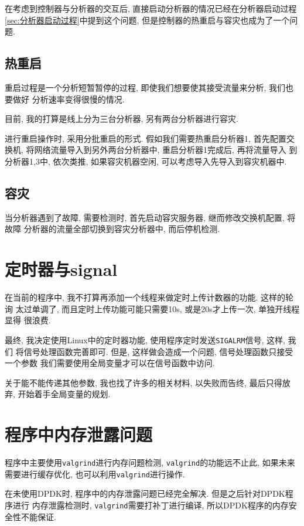 在考虑到控制器与分析器的交互后,
直接启动分析器的情况已经在分析器启动过程\ref{sec:分析器启动过程}中提到这个问题,
但是控制器的热重启与容灾也成为了一个问题.

\subsection{热重启}

重启过程是一个分析短暂暂停的过程, 即使我们想要使其接受流量来分析,
我们也要做好 分析速率变得很慢的情况.

目前, 我的打算是线上分为三台分析器, 另有两台分析器进行容灾.

进行重启操作时, 采用分批重启的形式. 假如我们需要热重启分析器1,
首先配置交换机, 将网络流量导入到另外两台分析器中, 重启分析器1完成后,
再将流量导入 到分析器1,3中, 依次类推, 如果容灾机器空闲,
可以考虑导入先导入到容灾机器中.

\subsection{容灾}

当分析器遇到了故障, 需要检测时, 首先启动容灾服务器, 继而修改交换机配置,
将故障 分析器的流量全部切换到容灾分析器中, 而后停机检测.

\section{定时器与signal}

在当前的程序中, 我不打算再添加一个线程来做定时上传计数器的功能.
这样的轮询 太过单调了, 而且定时上传功能可能只需要10s, 或是20s才上传一次,
单独开线程显得 很浪费.

最终, 我决定使用Linux中的定时器功能,
使用程序定时发送\texttt{SIGALRM}信号, 这样, 我们 将信号处理函数完善即可.
但是, 这样做会造成一个问题, 信号处理函数只接受一个参数
我们需要使用全局变量才可以在信号函数中访问.

关于能不能传递其他参数, 我也找了许多的相关材料, 以失败而告终,
最后只得放弃, 开始着手全局变量的规划.

\section{程序中内存泄露问题}

程序中主要使用\texttt{valgrind}进行内存问题检测,
\texttt{valgrind}的功能远不止此, 如果未来 需要进行缓存优化,
也可以利用\texttt{valgrind}进行操作.

在未使用DPDK时, 程序中的内存泄露问题已经完全解决.
但是之后针对DPDK程序进行 内存泄露检测时,
\texttt{valgrind}需要打补丁进行编译, 所以DPDK程序的内存安全性不能保证.

